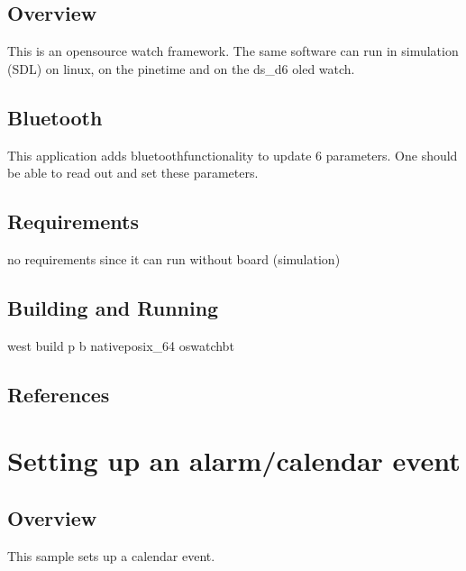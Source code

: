 \documentclass[letterpaper,10pt,english]{sphinxmanual}
\begin{document}
\subsection{Overview}
\label{\detokenize{samples/oswatch-btREADME:overview}}
This is an opensource watch framework.
The same software can run in simulation (SDL) on linux, on the pinetime and on the ds\_d6 oled watch.


\subsection{Bluetooth}
\label{\detokenize{samples/oswatch-btREADME:bluetooth}}
This application adds bluetoothfunctionality to update 6 parameters.
One should be able to read out and set these parameters.


\subsection{Requirements}
\label{\detokenize{samples/oswatch-btREADME:requirements}}
no requirements since it can run without board (simulation)


\subsection{Building and Running}
\label{\detokenize{samples/oswatch-btREADME:building-and-running}}
west build \sphinxhyphen{}p \sphinxhyphen{}b  native\sphinxhyphen{}posix\_64 oswatch\sphinxhyphen{}bt


\subsection{References}
\label{\detokenize{samples/oswatch-btREADME:references}}

\section{Setting up an alarm/calendar event}
\label{\detokenize{samples/oswatch-calendarREADME:setting-up-an-alarm-calendar-event}}\label{\detokenize{samples/oswatch-calendarREADME:oswatch}}\label{\detokenize{samples/oswatch-calendarREADME::doc}}

\subsection{Overview}
\label{\detokenize{samples/oswatch-calendarREADME:overview}}
This sample sets up a calendar event.
\end{document}
